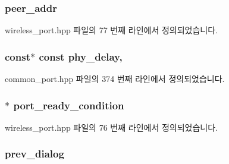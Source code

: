 \subsubsection[{\texorpdfstring{peer\+\_\+addr}{peer_addr}}]{ peer\+\_\+addr\hspace{0.3cm}{\ttfamily [private]}}\hypertarget{class_wireless_port_a2e3c335f16cf24c8ca44069a6c6149e0}{}\label{class_wireless_port_a2e3c335f16cf24c8ca44069a6c6149e0}


wireless\+\_\+port.\+hpp 파일의 77 번째 라인에서 정의되었습니다.

\subsubsection[{\texorpdfstring{phy\+\_\+delay}{phy_delay}}]{ const$\ast$ const phy\+\_\+delay\hspace{0.3cm}{\ttfamily [protected]}, {\ttfamily [inherited]}}\hypertarget{class_common_port_aa00ef04a42536f5b6a5086467cd1e968}{}\label{class_common_port_aa00ef04a42536f5b6a5086467cd1e968}


common\+\_\+port.\+hpp 파일의 374 번째 라인에서 정의되었습니다.

\subsubsection[{\texorpdfstring{port\+\_\+ready\+\_\+condition}{port_ready_condition}}]{$\ast$ port\+\_\+ready\+\_\+condition\hspace{0.3cm}{\ttfamily [private]}}\hypertarget{class_wireless_port_af34f0a0361d75a05cfe798511931cf1b}{}\label{class_wireless_port_af34f0a0361d75a05cfe798511931cf1b}


wireless\+\_\+port.\+hpp 파일의 76 번째 라인에서 정의되었습니다.

\subsubsection[{\texorpdfstring{prev\+\_\+dialog}{prev_dialog}}]{ prev\+\_\+dialog\hspace{0.3cm}{\ttfamily [private]}}\hypertarget{class_wireless_port_a837ae08924bbe166dc511f00c6f64104}{}\label{class_wireless_port_a837ae08924bbe166dc511f00c6f64104}


